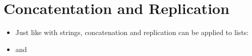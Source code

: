 \documentclass[letterpaper,10pt,english]{sphinxmanual}
\begin{document}
\section{Concatentation and Replication}
\label{\detokenize{lecture_notes/lec10_lists2:concatentation-and-replication}}\begin{itemize}
\item {} 
Just like with strings, concatenation and replication can be
applied to lists:

%
\begin{sphinxVerbatim}[commandchars=\\\{\}]
  \PYG{p}{[}\PYG{p}{]}\PYG{p}{[}\PYG{p}{]}
\end{sphinxVerbatim}

\item {} 
and

%
\begin{sphinxVerbatim}[commandchars=\\\{\}]
\PYG{p}{[}\PYG{p}{]}
\end{sphinxVerbatim}

\end{itemize}
\end{document}
